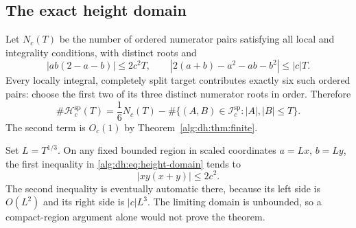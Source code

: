 \documentclass[11pt]{article}
\numberwithin{equation}{section}
\theoremstyle{plain}
\theoremstyle{plain}
\theoremstyle{plain}
\theoremstyle{definition}
\theoremstyle{definition}
\theoremstyle{definition}
\theoremstyle{remark}
\newcommand{\Hsplit}{\mathcal H^{\mathrm{sp}}}
\newcommand{\Isplit}{\mathcal I^{\mathrm{sp}}}
\begin{document}
\subsection{The exact height domain}
Let $N_c(T)$ be the number of ordered numerator pairs satisfying all local
and integrality conditions, with distinct roots and
\begin{equation}\label{alg:dh:eq:height-domain}
 |ab(2-a-b)|\le2c^2T,\qquad
 |2(a+b)-a^2-ab-b^2|\le |c|T.
\end{equation}
Every locally integral, completely split target contributes exactly six
such ordered pairs: choose the first two of its three distinct numerator
roots in order. Therefore
\begin{equation}\label{alg:dh:eq:six-to-one}
 \#\Hsplit_c(T)=\frac16N_c(T)-\#\{(A,B)\in\Isplit_c:|A|,|B|\le T\}.
\end{equation}
The second term is $O_c(1)$ by Theorem~\ref{alg:dh:thm:finite}.

Set $L=T^{1/3}$. On any fixed bounded region in scaled coordinates
$a=Lx$, $b=Ly$, the first inequality in \eqref{alg:dh:eq:height-domain} tends to
\begin{equation}\label{alg:dh:eq:limit-domain}
 |xy(x+y)|\le2c^2.
\end{equation}
The second inequality is eventually automatic there, because its left
side is $O(L^2)$ and its right side is $|c|L^3$.
The limiting domain is unbounded, so a compact-region argument alone
would not prove the theorem.
\end{document}
